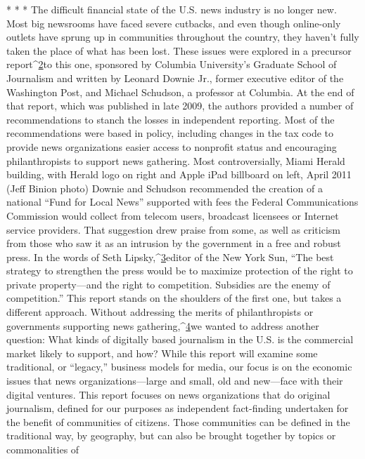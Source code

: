 * * *
The difficult financial state of the U.S. news industry is no longer new. Most
big newsrooms have faced severe cutbacks, and even though online-only outlets
have sprung up in communities throughout the country, they haven't fully taken
the place of what has been lost.
These issues were explored in a precursor report^{\href{#endnotes-introduction}{2}}to this one, sponsored by
Columbia University's Graduate School of Journalism and written by Leonard
Downie Jr., former executive editor of the Washington Post, and Michael Schudson,
a professor at Columbia. At the end of that report, which was published in
late 2009, the authors provided a number of recommendations to stanch the
losses in independent reporting.
Most of the recommendations were based in policy, including changes in the
tax code to provide news organizations easier access to nonprofit status and
encouraging philanthropists to support news gathering. Most controversially,
Miami Herald building, with Herald logo on right and Apple iPad billboard on left, April 2011 (Jeff Binion photo)
Downie and Schudson recommended the creation of a national ``Fund for Local
News'' supported with fees the Federal Communications Commission would
collect from telecom users, broadcast licensees or Internet service providers.
That suggestion drew praise from some, as well as criticism from those who
saw it as an intrusion by the government in a free and robust press. In the words
of Seth Lipsky,^{\href{#endnotes-introduction}{3}}editor of the New York Sun, ``The best strategy to strengthen the
press would be to maximize protection of the right to private property—and the
right to competition. Subsidies are the enemy of competition.''
This report stands on the shoulders of the first one, but takes a different approach.
Without addressing the merits of philanthropists or governments supporting
news gathering,^{\href{#endnotes-introduction}{4}}we wanted to address another question: What kinds of
digitally based journalism in the U.S. is the commercial market likely to support,
and how?
While this report will examine some traditional, or ``legacy,'' business models
for media, our focus is on the economic issues that news organizations—large
and small, old and new—face with their digital ventures.
This report focuses on news organizations that do original journalism, defined
for our purposes as independent fact-finding undertaken for the benefit of communities
of citizens. Those communities can be defined in the traditional way,
by geography, but can also be brought together by topics or commonalities of
